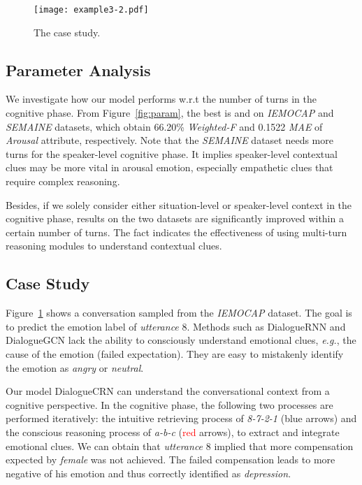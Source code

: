 \documentclass[11pt,a4paper]{article}
\begin{document}
\begin{figure}[t]
  \centering
  \texttt{[image: example3-2.pdf]}
  \caption{The case study. }
  \label{fig:case}
\end{figure}

\subsection{Parameter Analysis}
We investigate how our model performs w.r.t the number of turns in the cognitive phase.
From Figure~\ref{fig:param}, the best  is  and  on {\it IEMOCAP} and {\it SEMAINE} datasets, which obtain 66.20\% \textit{Weighted-F} and 0.1522 \textit{MAE} of \textit{Arousal} attribute, respectively.
Note that the {\it SEMAINE} dataset needs more turns for the speaker-level cognitive phase. It implies speaker-level contextual clues may be more vital in arousal emotion, especially empathetic clues that require complex reasoning.



Besides, if we solely consider either situation-level or speaker-level context in the cognitive phase, results on the two datasets are significantly improved within a certain number of turns.
The fact indicates the effectiveness of using multi-turn reasoning modules to understand contextual clues.






\subsection{Case Study}
Figure~\ref{fig:case} shows a conversation sampled from the \textit{IEMOCAP} dataset.
The goal is to predict the emotion label of \textit{utterance} 8.
Methods such as DialogueRNN and DialogueGCN lack the ability to consciously understand emotional clues, {\it e.g.}, the cause of the emotion (failed expectation). They are easy to mistakenly identify the emotion as {\it angry} or {\it neutral}. 


Our model DialogueCRN can understand the conversational context from a cognitive perspective. 
In the cognitive phase, the following two processes are performed iteratively:
the intuitive retrieving process of {\it 8-7-2-1} (\textcolor[RGB]{5,3,128}{blue} arrows) and the conscious reasoning process of  {\it a-b-c} (\textcolor{red}{red} arrows), to extract and integrate emotional clues.
We can obtain that {\it utterance} 8 implied that more compensation expected by {\it female} was not achieved.
The failed compensation leads to more negative of his emotion and thus correctly identified as {\it depression}. 
\end{document}
